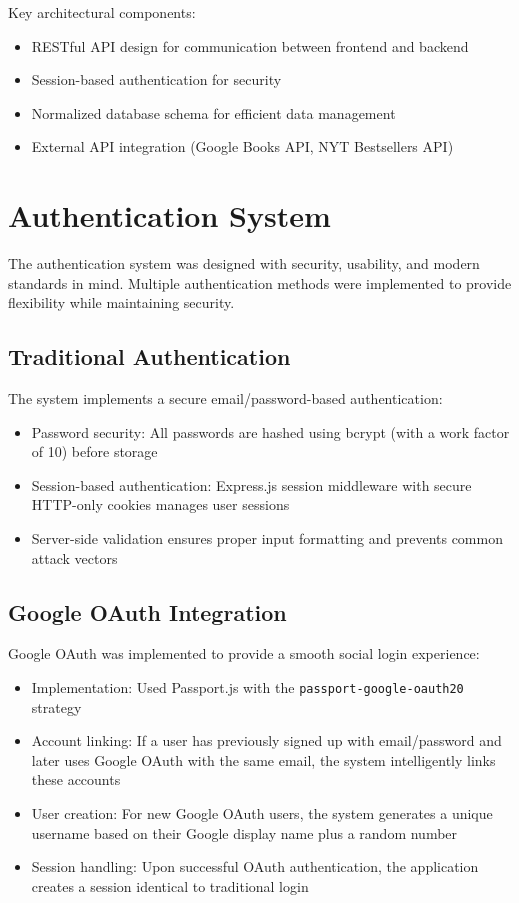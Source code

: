 \documentclass{article}
\begin{document}
Key architectural components:
\begin{itemize}
    \item RESTful API design for communication between frontend and backend
    \item Session-based authentication for security
    \item Normalized database schema for efficient data management
    \item External API integration (Google Books API, NYT Bestsellers API)
\end{itemize}

\section{Authentication System}
The authentication system was designed with security, usability, and modern standards in mind. Multiple authentication methods were implemented to provide flexibility while maintaining security.

\subsection{Traditional Authentication}
The system implements a secure email/password-based authentication:
\begin{itemize}
    \item Password security: All passwords are hashed using bcrypt (with a work factor of 10) before storage
    \item Session-based authentication: Express.js session middleware with secure HTTP-only cookies manages user sessions
    \item Server-side validation ensures proper input formatting and prevents common attack vectors
\end{itemize}

\subsection{Google OAuth Integration}
Google OAuth was implemented to provide a smooth social login experience:
\begin{itemize}
    \item Implementation: Used Passport.js with the \texttt{passport-google-oauth20} strategy
    \item Account linking: If a user has previously signed up with email/password and later uses Google OAuth with the same email, the system intelligently links these accounts
    \item User creation: For new Google OAuth users, the system generates a unique username based on their Google display name plus a random number
    \item Session handling: Upon successful OAuth authentication, the application creates a session identical to traditional login
\end{itemize}
\end{document}
